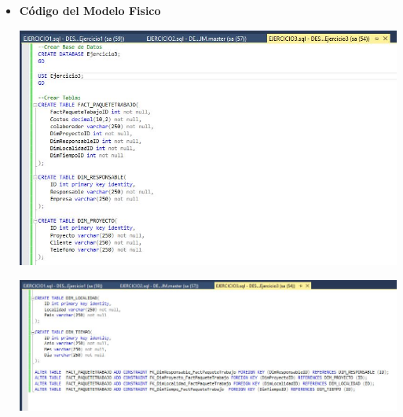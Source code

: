 \begin{itemize}
    \item \textbf{Código del Modelo Fisico}

	\begin{center}
	\includegraphics[width=17cm]{./Imagenes/Ejercicio3Fisico1}
	\end{center}	

	\begin{center}
	\includegraphics[width=17cm]{./Imagenes/Ejercicio3Fisico2}
	\end{center}	
\end{itemize}